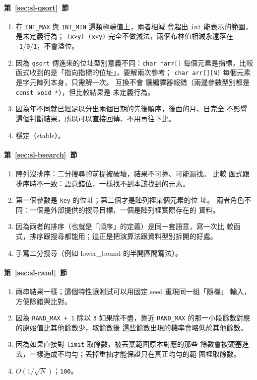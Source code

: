 \paragraph{第~\ref{sec:sl-qsort}~節}
\begin{enumerate}
\item 在 \texttt{INT\_MAX} 與 \texttt{INT\_MIN} 這類極端值上，兩者相減
會超出 \texttt{int} 能表示的範圍，是未定義行為；
\texttt{(x>y)-(x<y)} 完全不做減法，兩個布林值相減永遠落在
\texttt{-1}/\texttt{0}/\texttt{1}，不會溢位。
\item 因為 \texttt{qsort} 傳進來的位址型別意義不同：\texttt{char *arr[]}
每個元素是指標，比較函式收到的是「指向指標的位址」，要解兩次參考；
\texttt{char arr[][N]} 每個元素是字元陣列本身，只需解一次。 互換不會
讓編譯器報錯（兩邊參數型別都是 \texttt{const void *}），但比較結果是
未定義行為。
\item 因為年不同就已經足以分出兩個日期的先後順序，後面的月、日完全
不影響這個判斷結果，所以可以直接回傳、不用再往下比。
\item 穩定（stable）。
\end{enumerate}

\paragraph{第~\ref{sec:sl-bsearch}~節}
\begin{enumerate}
\item 陣列沒排序：二分搜尋的前提被破壞，結果不可靠、可能漏找。 比較
函式跟排序時不一致：語意錯位，一樣找不到本該找到的元素。
\item 第一個參數是 \texttt{key} 的位址；第二個才是陣列裡某個元素的位
址。 兩者角色不同：一個是外部提供的搜尋目標，一個是陣列裡實際存在的
資料。
\item 因為兩者的排序（也就是「順序」的定義）是同一套語意，寫一次比
較函式，排序跟搜尋都能用；這正是把演算法跟資料型別拆開的好處。
\item 手寫二分搜尋（例如 lower\_bound 的半開區間寫法）。
\end{enumerate}

\paragraph{第~\ref{sec:sl-rand}~節}
\begin{enumerate}
\item 兩串結果一樣；這個特性讓測試可以用固定 seed 重現同一組「隨機」
輸入，方便除錯與比對。
\item 因為 \texttt{RAND\_MAX + 1} 除以 \texttt{3} 如果除不盡，靠近
\texttt{RAND\_MAX} 的那一小段餘數對應的原始值比其他餘數少，取餘數後
這些餘數出現的機率會略低於其他餘數。
\item 因為如果直接對 \texttt{limit} 取餘數，被丟棄範圍原本對應的那些
餘數會被硬塞進去，一樣造成不均勻；丟掉重抽才能保證只在真正均勻的範
圍裡取餘數。
\item $O(1/\sqrt{N})$；\texttt{100}。
\end{enumerate}

